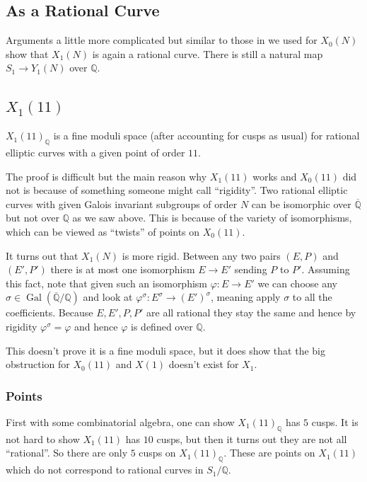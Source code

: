 \documentclass[11pt]{article}
\newcommand{\BB}[1]{\mathbb{#1}} %
\newcommand{\QQ}{\BB{Q}}
\newcommand{\Gal}{\operatorname{Gal}}
\theoremstyle{plain}
\theoremstyle{remark}
\begin{document}
\subsection{As a Rational Curve}

Arguments a little more complicated but similar to those in we used for $X_0(N)$ show that $X_1(N)$ is again a rational curve. There is still a natural map $S_1 \to Y_1(N)$ over $\QQ$.

\subsection{$X_1(11)$}

\begin{fact}
	$X_1(11)_{\QQ}$ is a fine moduli space (after accounting for cusps as usual) for rational elliptic curves with a given point of order $11$.
\end{fact}

The proof is difficult but the main reason why $X_1(11)$ works and $X_0(11)$ did not is because of something someone might call ``rigidity''. Two rational elliptic curves with given Galois invariant subgroups of order $N$ can be isomorphic over $\overline{\QQ}$ but not over $\QQ$ as we saw above. This is because of the variety of isomorphisms, which can be viewed as ``twists'' of points on $X_0(11)$.

It turns out that $X_1(N)$ is more rigid. Between any two pairs $(E,P)$ and $(E',P')$ there is at most one isomorphism $E\to E'$ sending $P$ to $P'$. Assuming this fact, note that given such an isomorphism $\varphi:E\to E'$ we can choose any $\sigma\in\Gal(\overline{\QQ}/\QQ)$ and look at $\varphi^{\sigma}:E^{\sigma}\to (E')^{\sigma}$, meaning apply $\sigma$ to all the coefficients. Because $E,E',P,P'$ are all rational they stay the same and hence by rigidity $\varphi^\sigma = \varphi$ and hence $\varphi$ is defined over $\QQ$.

This doesn't prove it is a fine moduli space, but it does show that the big obstruction for $X_0(11)$ and $X(1)$ doesn't exist for $X_1$.

\subsubsection{Points}

First with some combinatorial algebra, one can show $X_1(11)_{\QQ}$ has $5$ cusps. It is not hard to show $X_1(11)$ has $10$ cusps, but then it turns out they are not all ``rational''. So there are only $5$ cusps on $X_1(11)_{\QQ}$. These are points on $X_1(11)$ which do not correspond to rational curves in $S_1/\QQ$.
\end{document}

